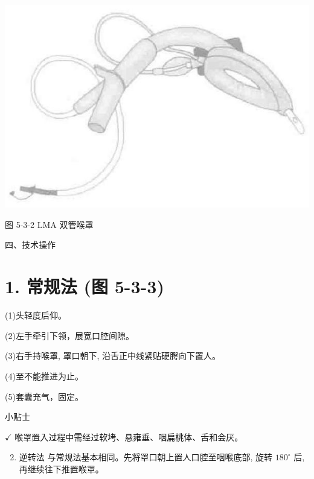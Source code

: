 \documentclass[10pt]{article}
\begin{document}
\begin{center}
\includegraphics[max width=\textwidth]{2024_07_05_645bb794a4d4f32ee0c8g-294}
\end{center}

图 5-3-2 LMA 双管喉罩

四、技术操作

\section*{1. 常规法 (图 5-3-3)}
(1)头轻度后仰。

(2)左手牵引下领，展宽口腔间隙。

(3)右手持喉罩, 罩口朝下, 沿舌正中线紧贴硬腭向下置人。

(4)至不能推进为止。

(5)套囊充气，固定。

小贴士

$\checkmark$ 喉罩置入过程中需经过软㘼、悬雍垂、咽扁桃体、舌和会厌。

\begin{enumerate}
  \setcounter{enumi}{1}
  \item 逆转法 与常规法基本相同。先将罩口朝上置人口腔至咽喉底部, 旋转 $180^{\circ}$ 后, 再继续往下推置喉罩。
\end{enumerate}
\end{document}
